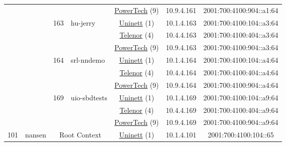 \begin{small}
\begin{center}
\begin{longtable}{|c|c|c|c|c|c|c|c|}
  &  &  &  & \multicolumn{2}{|c|}{\tiny{\href{http://www.powertech.no}{PowerTech} (9)}} & \tiny{10.9.4.161} & \tiny{2001:700:4100:904::a1:64} \\* \cline{3-3}\cline{4-4}\cline{5-5}\cline{6-6}\cline{7-7}\cline{8-8}
  &  & \multirow{3}{*}{\tiny{163}} & \multicolumn{1}{|l|}{\multirow{3}{*}{\tiny{hu-jerry}}} & \multicolumn{2}{|c|}{\tiny{\href{https://www.uninett.no}{Uninett} (1)}} & \tiny{10.1.4.163} & \tiny{2001:700:4100:104::a3:64} \\* \cline{5-5}\cline{6-6}\cline{7-7}\cline{8-8}
  &  &  &  & \multicolumn{2}{|c|}{\tiny{\href{https://www.telenor.no}{Telenor} (4)}} & \tiny{10.4.4.163} & \tiny{2001:700:4100:404::a3:64} \\* \cline{5-5}\cline{6-6}\cline{7-7}\cline{8-8}
  &  &  &  & \multicolumn{2}{|c|}{\tiny{\href{http://www.powertech.no}{PowerTech} (9)}} & \tiny{10.9.4.163} & \tiny{2001:700:4100:904::a3:64} \\* \cline{3-3}\cline{4-4}\cline{5-5}\cline{6-6}\cline{7-7}\cline{8-8}
  &  & \multirow{3}{*}{\tiny{164}} & \multicolumn{1}{|l|}{\multirow{3}{*}{\tiny{srl-nndemo}}} & \multicolumn{2}{|c|}{\tiny{\href{https://www.uninett.no}{Uninett} (1)}} & \tiny{10.1.4.164} & \tiny{2001:700:4100:104::a4:64} \\* \cline{5-5}\cline{6-6}\cline{7-7}\cline{8-8}
  &  &  &  & \multicolumn{2}{|c|}{\tiny{\href{https://www.telenor.no}{Telenor} (4)}} & \tiny{10.4.4.164} & \tiny{2001:700:4100:404::a4:64} \\* \cline{5-5}\cline{6-6}\cline{7-7}\cline{8-8}
  &  &  &  & \multicolumn{2}{|c|}{\tiny{\href{http://www.powertech.no}{PowerTech} (9)}} & \tiny{10.9.4.164} & \tiny{2001:700:4100:904::a4:64} \\* \cline{3-3}\cline{4-4}\cline{5-5}\cline{6-6}\cline{7-7}\cline{8-8}
  &  & \multirow{3}{*}{\tiny{169}} & \multicolumn{1}{|l|}{\multirow{3}{*}{\tiny{uio-sbdtests}}} & \multicolumn{2}{|c|}{\tiny{\href{https://www.uninett.no}{Uninett} (1)}} & \tiny{10.1.4.169} & \tiny{2001:700:4100:104::a9:64} \\* \cline{5-5}\cline{6-6}\cline{7-7}\cline{8-8}
  &  &  &  & \multicolumn{2}{|c|}{\tiny{\href{https://www.telenor.no}{Telenor} (4)}} & \tiny{10.4.4.169} & \tiny{2001:700:4100:404::a9:64} \\* \cline{5-5}\cline{6-6}\cline{7-7}\cline{8-8}
  &  &  &  & \multicolumn{2}{|c|}{\tiny{\href{http://www.powertech.no}{PowerTech} (9)}} & \tiny{10.9.4.169} & \tiny{2001:700:4100:904::a9:64} \\ \hline
 \multirow{33}{*}{\tiny{101}} & \multicolumn{1}{|l|}{\multirow{33}{*}{\tiny{nansen}}} & \multicolumn{2}{|c|}{\multirow{3}{*}{\tiny{Root Context}}} & \multicolumn{2}{|c|}{\tiny{\href{https://www.uninett.no}{Uninett} (1)}} & \tiny{10.1.4.101} & \tiny{2001:700:4100:104::65} \\* \cline{5-5}\cline{6-6}\cline{7-7}\cline{8-8}

\end{longtable}
\end{center}
\end{small}
